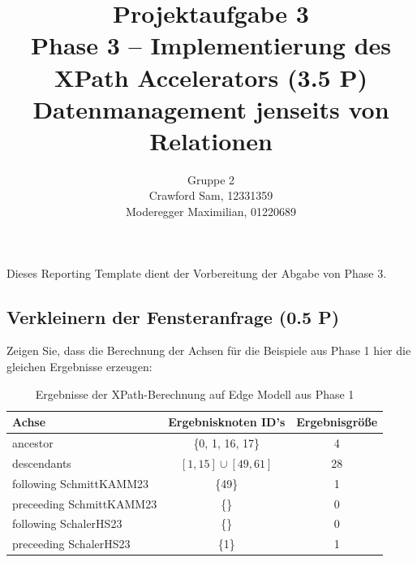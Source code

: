 \documentclass[11pt]{scrartcl}
\title{
  \textbf{\large Projektaufgabe 3 } \\
  Phase 3 – Implementierung des XPath Accelerators (3.5 P) \\
  {\large Datenmanagement jenseits von Relationen}
}
\author{
  Gruppe 2 \\
  \large Crawford Sam, 12331359 \\
  \large Moderegger Maximilian, 01220689
}
\begin{document}
\maketitle\thispagestyle{empty}

Dieses Reporting Template dient der Vorbereitung der Abgabe von Phase 3.

\subsection*{Verkleinern der Fensteranfrage (0.5 P)}

Zeigen Sie, dass die Berechnung der Achsen für die Beispiele aus Phase 1 hier die gleichen Ergebnisse erzeugen:

\begin{table}[h]
	\centering
	\begin{center}
		\begin{tabular}{ l | c c }
			\toprule
			Achse                    & Ergebnisknoten ID's     & Ergebnisgröße \\
			\midrule
			ancestor                 & \{0, 1, 16, 17\}        & 4             \\
			descendants              & $[1, 15] \cup [49, 61]$ & 28            \\
			following SchmittKAMM23  & \{49\}                  & 1             \\
			preceeding SchmittKAMM23 & \{\}                    & 0             \\
			following SchalerHS23    & \{\}                    & 0             \\
			preceeding SchalerHS23   & \{1\}                   & 1             \\
			\bottomrule
		\end{tabular}
	\end{center}
	\caption{Ergebnisse der XPath-Berechnung auf Edge Modell aus Phase 1}
	\label{tab:ErgebnisseDerXPathBerechnungEdgePhase3}
\end{table}
\end{document}
